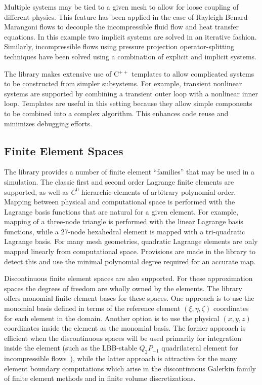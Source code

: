 \documentclass[global,twocolumn,final]{svjour}
\newcommand{\cpp}{C{\tiny$^{++}$}}
\begin{document}
Multiple systems may be tied to a given mesh to allow for loose
coupling of different physics.  This feature has been applied in the
case of Rayleigh B$\acute{\text{e}}$nard Marangoni flows to decouple
the incompressible fluid flow and heat transfer equations.  In this
example two implicit systems are solved in an iterative fashion.
Similarly, incompressible flows using pressure projection
operator-splitting techniques have been solved using a combination of explicit
and implicit systems.

The library makes extensive use of \cpp{} templates to allow
complicated systems to be constructed from simpler subsystems.  For
example, transient nonlinear systems are supported by combining a
transient outer loop with a nonlinear inner loop.  Templates are
useful in this setting because they allow simple components to be
combined into a complex algorithm. This enhances code reuse and
minimizes debugging efforts.

\subsection{Finite Element Spaces\label{sec:element_spaces}}
The library provides a number of finite element ``families'' that may
be used in a simulation.  The classic first and second order Lagrange
finite elements are supported, as well as $C^0$ hierarchic elements
of arbitrary polynomial order.  Mapping between physical and
computational space is performed with the Lagrange basis functions
that are natural for a given element.  For example, mapping of a
three-node triangle is performed with the linear Lagrange basis
functions, while a 27-node hexahedral element is mapped with a
tri-quadratic Lagrange basis.  For many mesh geometries, quadratic Lagrange
elements are only mapped linearly from computational space.
Provisions are made in the library to detect this and use the minimal
polynomial degree required for an accurate map.

Discontinuous finite element spaces are also supported.  For these
approximation spaces the degrees of freedom are wholly owned by the
elements.  The library offers monomial finite element bases for these
spaces.  One approach is to use the monomial basis defined in terms of
the reference element $(\xi,\eta,\zeta)$ coordinates for each element
in the domain.  Another option is to use the physical $(x,y,z)$
coordinates inside the element as the monomial basis.  The former
approach is efficient when the discontinuous spaces will be used
primarily for integration inside the element (such as the LBB-stable
$Q_2P_{-1}$ quadrilateral element for incompressible
flows~\cite{Gres-1998}), while the latter approach is attractive for
the many element boundary computations which arise in the
discontinuous Gale\-r\-kin family of finite element methods and in
finite volume discretizations.
\end{document}
